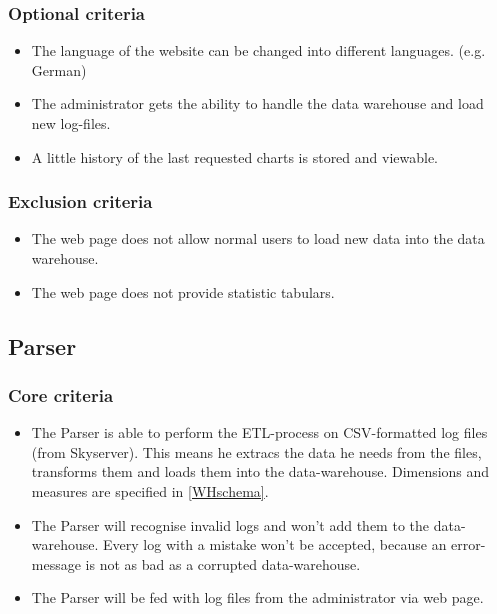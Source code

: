 \subsubsection{Optional criteria}
\begin{itemize}
\item The language of the website can be changed into different languages. (e.g. German)

\item The administrator gets the ability to handle the data warehouse and load new log-files.

\item A little history of the last requested charts is stored and viewable.
\end{itemize}

\subsubsection{Exclusion criteria}
\begin{itemize}
\item The web page does not allow normal users to load new data into the data warehouse.

\item The web page does not provide statistic tabulars. 
\end{itemize}


\subsection{Parser}

\subsubsection{Core criteria} %
\begin{itemize}
\item The Parser is able to perform the ETL-process on CSV-formatted log files (from Skyserver). %
This means he extracs the data he needs from the files, transforms them 
and loads them into the data-warehouse. Dimensions and measures are specified in \ref{WHschema}.
  
\item The Parser will recognise invalid logs and won't add them to the data-warehouse.
 Every log with a mistake won't be accepted, because an error-message is not 
 as bad as a corrupted data-warehouse. 
 
\item The Parser will be fed with log files from the administrator via web page.
\end{itemize} 

